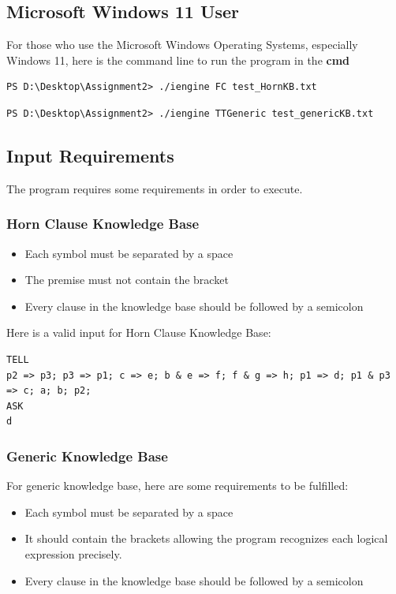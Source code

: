 \documentclass{assignment}
\begin{document}
\subsection{Microsoft Windows 11 User}
For those who use the Microsoft Windows Operating Systems, especially Windows 11, here is the command line to run the program in the \textbf{cmd}

\begin{verbatim}
PS D:\Desktop\Assignment2> ./iengine FC test_HornKB.txt 
\end{verbatim}

\begin{verbatim}
PS D:\Desktop\Assignment2> ./iengine TTGeneric test_genericKB.txt 
\end{verbatim}



\subsection{Input Requirements}
The program requires some requirements in order to execute.
\subsubsection{Horn Clause Knowledge Base}

\begin{itemize}
  \item Each symbol must be separated by a space
  \item The premise must not contain the bracket
  \item Every clause in the knowledge base should be followed by a semicolon
\end{itemize}

Here is a valid input for Horn Clause Knowledge Base: 
\begin{lstlisting}[caption={Valid Input For Horn Clause}]
TELL
p2 => p3; p3 => p1; c => e; b & e => f; f & g => h; p1 => d; p1 & p3 => c; a; b; p2;
ASK
d  
\end{lstlisting}

\subsubsection{Generic Knowledge Base}

For generic knowledge base, here are some requirements to be fulfilled:
\begin{itemize}
  \item Each symbol must be separated by a space
  \item It should contain the brackets allowing the program recognizes each logical expression precisely.
  \item Every clause in the knowledge base should be followed by a semicolon
\end{itemize}
\end{document}
